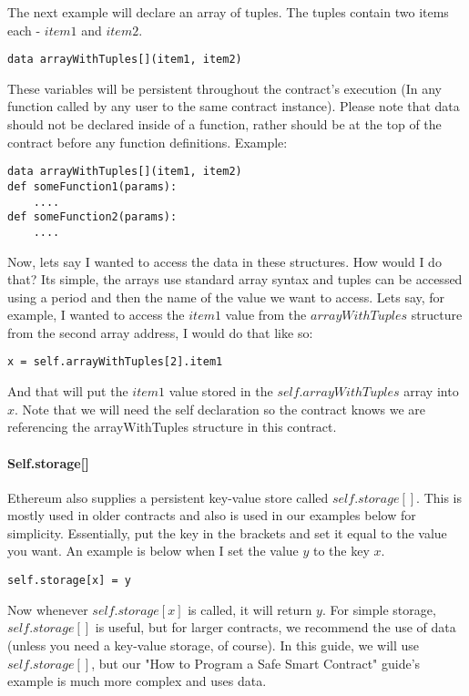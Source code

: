 \documentclass[12pt]{article}
\begin{document}
The next example will declare an array of tuples. The tuples contain two items each - $item1$ and $item2$.

\begin{verbatim}
data arrayWithTuples[](item1, item2)
\end{verbatim}

These variables will be persistent throughout the contract's execution (In any function called by any user to the same contract instance). Please note that data should not be declared inside of a function, rather should be at the top of the contract before any function definitions. Example:

\begin{verbatim}
data arrayWithTuples[](item1, item2)
def someFunction1(params):
	....
def someFunction2(params):
	....
\end{verbatim}

Now, lets say I wanted to access the data in these structures. How would I do that? Its simple, the arrays use standard array syntax and tuples can be accessed using a period and then the name of the value we want to access. Lets say, for example, I wanted to access the $item1$ value from the $arrayWithTuples$ structure from the second array address, I would do that like so:

\begin{verbatim}
x = self.arrayWithTuples[2].item1
\end{verbatim}

And that will put the $item1$ value stored in the $self.arrayWithTuples$ array into $x$. \cite{Serpent} Note that we will need the self declaration so the contract knows we are referencing the arrayWithTuples structure in this contract.

\paragraph{Self.storage[]}
Ethereum also supplies a persistent key-value store called $self.storage[]$. This is mostly used in older contracts and also is used in our examples below for simplicity. Essentially, put the key in the brackets and set it equal to the value you want. An example is below when I set the value $y$ to the key $x$.

\begin{verbatim}
self.storage[x] = y
\end{verbatim}

Now whenever $self.storage[x]$ is called, it will return $y$. For simple storage, $self.storage[]$ is useful, but for larger contracts, we recommend the use of data (unless you need a key-value storage, of course). \cite{Serpent, Serpent1.0(old)} In this guide, we will use $self.storage[]$, but our "How to Program a Safe Smart Contract" guide's example is much more complex and uses data. 
\end{document}

